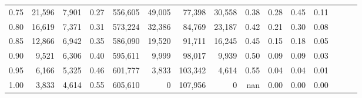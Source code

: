 \begin{tabular}{rrrrrrrrrrrrrrr}
0.75 &  21,596 &  7,901 &  0.27 &  556,605 &   49,005 &   77,398 &   30,558 &  0.38 &  0.28 &  0.45 &      0.11 \\
0.80 &  16,619 &  7,371 &  0.31 &  573,224 &   32,386 &   84,769 &   23,187 &  0.42 &  0.21 &  0.30 &      0.08 \\
0.85 &  12,866 &  6,942 &  0.35 &  586,090 &   19,520 &   91,711 &   16,245 &  0.45 &  0.15 &  0.18 &      0.05 \\
0.90 &   9,521 &  6,306 &  0.40 &  595,611 &    9,999 &   98,017 &    9,939 &  0.50 &  0.09 &  0.09 &      0.03 \\
0.95 &   6,166 &  5,325 &  0.46 &  601,777 &    3,833 &  103,342 &    4,614 &  0.55 &  0.04 &  0.04 &      0.01 \\
1.00 &   3,833 &  4,614 &  0.55 &  605,610 &        0 &  107,956 &        0 &   nan &  0.00 &  0.00 &      0.00 \\
\bottomrule
\end{tabular}

